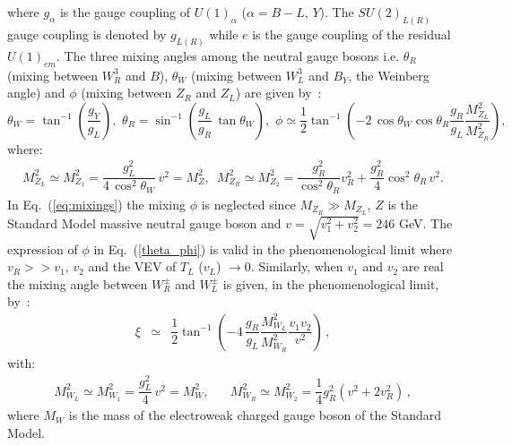 \documentclass[11pt]{article}
\begin{document}
where $g_{\alpha}$ is the gauge coupling of
$U(1)_{\alpha}$ ($\alpha=B-L,\,Y$). The $SU(2)_{L(R)}$ gauge
coupling is denoted by $g_{L(R)}$ while $e$ is the
gauge coupling of the residual $U(1)_{em}$. 
The three mixing angles among the neutral gauge
bosons i.e. $\theta_R$ (mixing between $W^{3}_R$ and $B$), $\theta_W$
(mixing between $W^{3}_L$ and $B_Y$, the Weinberg angle) and $\phi$ 
(mixing between $Z_{R}$ and $Z_{L}$) are given by~\cite{Garcia-Cely_LR_pheno}:
\begin{equation}
\theta_W = \tan^{-1}\left(\dfrac{g_Y}{g_L}\right),\,\, 
\theta_R = \sin^{-1}\left(\dfrac{g_L}{g_R}\,\tan\theta_W\right),\,\, \phi \simeq \dfrac{1}{2}\tan^{-1}\left(-2\,\cos\theta_W\cos\theta_R
\dfrac{g_R}{g_L}\dfrac{M^2_{Z_L}}{M^2_{Z_R}}\right), 
\label{theta_phi}
\end{equation}
where: 
\begin{eqnarray}
M^2_{Z_L}\simeq M^2_{Z_1} = \dfrac{g^2_L}{4\,\cos^2\theta_W}\,v^2=M^2_Z,\,\,\,
M^2_{Z_R}\simeq M^2_{Z_2} = \dfrac{g^2_R}{\cos^2\theta_R} v^2_R +
\dfrac{g^2_R}{4} \cos^2\theta_R\,v^2.
\label{eq:mixings}
\end{eqnarray}
\noindent In Eq.~(\ref{eq:mixings}) the mixing $\phi$ is neglected since $M_{Z_R}\gg M_{Z_L}$,
$Z$ is the Standard Model massive neutral gauge boson and $v=\sqrt{v^2_1+v^2_2} =246$ GeV. 
The expression of $\phi$ in Eq.~(\ref{theta_phi}) is valid in the phenomenological limit where
$v_R>>v_1,\,v_2$ and the VEV of $T_L$ ($v_L$) $\rightarrow0$. Similarly,  when $v_1$ and $v_2$ are real the mixing angle between $W^{\pm}_{R}$ and $W^{\pm}_{L}$ is given, in the phenomenological limit, by~\cite{Garcia-Cely_LR_pheno}:
\begin{eqnarray}
\xi &\simeq& \dfrac{1}{2}\tan^{-1}\left(-4\,
\dfrac{g_R}{g_L}\dfrac{M^2_{W_L}}{M^2_{W_R}}\dfrac{v_1v_2}{v^2}\right)\,, 
\label{eq:tan_xi}
\end{eqnarray}
with:
\begin{eqnarray}
M^2_{W_L}\simeq M^2_{W_1} = \dfrac{g^2_L}{4}\,v^2=M^2_W,\,\,\,\,\,\,\,\,\,\,
M^2_{W_R}\simeq M^2_{W_2} = \dfrac{1}{4} g^2_R\left(v^2+2v^2_R\right)\,,
\end{eqnarray}
where $M_W$ is the mass of the electroweak charged gauge boson of the Standard Model.
\end{document}
